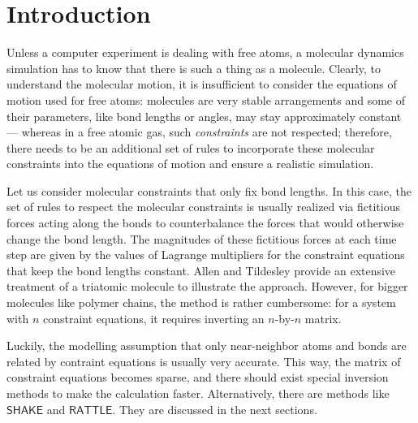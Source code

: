 \section{Introduction}
\label{sec:intro}
\par Unless a computer experiment is dealing with free atoms, a molecular dynamics simulation has to know that there is such a thing as a molecule. Clearly, to understand the molecular motion, it is insufficient to consider the equations of motion used for free atoms: molecules are very stable arrangements and some of their parameters, like bond lengths or angles, may stay approximately constant --- whereas in a free atomic gas, such \emph{constraints} are not respected; therefore, there needs to be an additional set of rules to incorporate these molecular constraints into the equations of motion and ensure a realistic simulation.
\par Let us consider molecular constraints that only fix bond lengths. In this case, the set of rules to respect the molecular constraints is usually realized via fictitious forces acting along the bonds to counterbalance the forces that would otherwise change the bond length. The magnitudes of these fictitious forces at each time step are given by the values of Lagrange multipliers for the constraint equations that keep the bond lengths constant. Allen and Tildesley \cite{allen} provide an extensive treatment of a triatomic molecule to illustrate the approach. However, for bigger molecules like polymer chains, the method is rather cumbersome: for a system with $n$ constraint equations, it requires inverting an $n$-by-$n$ matrix. 
\par Luckily, the modelling assumption that only near-neighbor atoms and bonds are related by contraint equations is usually very accurate. This way, the matrix of constraint equations becomes sparse, and there should exist special inversion methods to make the calculation faster. Alternatively, there are methods like $\textsf{SHAKE}$ and $\textsf{RATTLE}$. They are discussed in the next sections.